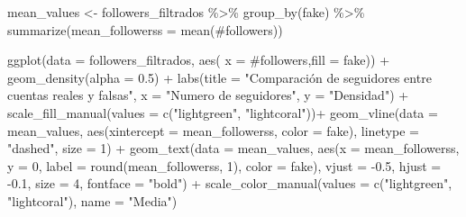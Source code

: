 \documentclass[
  letterpaper,
  DIV=11,
  numbers=noendperiod]{scrreprt}
\newenvironment{Shaded}{\begin{snugshade}}{\end{snugshade}}
\newcommand{\AttributeTok}[1]{\textcolor[rgb]{0.40,0.45,0.13}{#1}}
\newcommand{\DecValTok}[1]{\textcolor[rgb]{0.68,0.00,0.00}{#1}}
\newcommand{\FloatTok}[1]{\textcolor[rgb]{0.68,0.00,0.00}{#1}}
\newcommand{\FunctionTok}[1]{\textcolor[rgb]{0.28,0.35,0.67}{#1}}
\newcommand{\NormalTok}[1]{\textcolor[rgb]{0.00,0.23,0.31}{#1}}
\newcommand{\OtherTok}[1]{\textcolor[rgb]{0.00,0.23,0.31}{#1}}
\newcommand{\SpecialCharTok}[1]{\textcolor[rgb]{0.37,0.37,0.37}{#1}}
\newcommand{\StringTok}[1]{\textcolor[rgb]{0.13,0.47,0.30}{#1}}
\begin{document}
\begin{Shaded}
\begin{Highlighting}[]
\NormalTok{mean\_values }\OtherTok{\textless{}{-}}\NormalTok{ followers\_filtrados }\SpecialCharTok{\%\textgreater{}\%} 
  \FunctionTok{group\_by}\NormalTok{(fake) }\SpecialCharTok{\%\textgreater{}\%} 
  \FunctionTok{summarize}\NormalTok{(}\AttributeTok{mean\_followerss =} \FunctionTok{mean}\NormalTok{(}\StringTok{\textasciigrave{}}\AttributeTok{\#followers}\StringTok{\textasciigrave{}}\NormalTok{))}

\FunctionTok{ggplot}\NormalTok{(}\AttributeTok{data =}\NormalTok{ followers\_filtrados, }\FunctionTok{aes}\NormalTok{( }\AttributeTok{x =} \StringTok{\textasciigrave{}}\AttributeTok{\#followers}\StringTok{\textasciigrave{}}\NormalTok{,}\AttributeTok{fill =} \StringTok{\textasciigrave{}}\AttributeTok{fake}\StringTok{\textasciigrave{}}\NormalTok{)) }\SpecialCharTok{+}   \FunctionTok{geom\_density}\NormalTok{(}\AttributeTok{alpha =} \FloatTok{0.5}\NormalTok{) }\SpecialCharTok{+}   
  \FunctionTok{labs}\NormalTok{(}\AttributeTok{title =} \StringTok{"Comparación de seguidores entre cuentas reales y falsas"}\NormalTok{,        }
       \AttributeTok{x =} \StringTok{"Numero de seguidores"}\NormalTok{,        }
       \AttributeTok{y =} \StringTok{"Densidad"}\NormalTok{) }\SpecialCharTok{+}   
  \FunctionTok{scale\_fill\_manual}\NormalTok{(}\AttributeTok{values =} \FunctionTok{c}\NormalTok{(}\StringTok{"lightgreen"}\NormalTok{, }\StringTok{"lightcoral"}\NormalTok{))}\SpecialCharTok{+}
  \FunctionTok{geom\_vline}\NormalTok{(}\AttributeTok{data =}\NormalTok{ mean\_values, }\FunctionTok{aes}\NormalTok{(}\AttributeTok{xintercept =}\NormalTok{ mean\_followerss, }\AttributeTok{color =}\NormalTok{ fake), }\AttributeTok{linetype =} \StringTok{"dashed"}\NormalTok{, }\AttributeTok{size =} \DecValTok{1}\NormalTok{) }\SpecialCharTok{+}
   \FunctionTok{geom\_text}\NormalTok{(}\AttributeTok{data =}\NormalTok{ mean\_values, }\FunctionTok{aes}\NormalTok{(}\AttributeTok{x =}\NormalTok{ mean\_followerss, }\AttributeTok{y =} \DecValTok{0}\NormalTok{, }\AttributeTok{label =} \FunctionTok{round}\NormalTok{(mean\_followerss, }\DecValTok{1}\NormalTok{), }\AttributeTok{color =}\NormalTok{ fake),}
            \AttributeTok{vjust =} \SpecialCharTok{{-}}\FloatTok{0.5}\NormalTok{, }\AttributeTok{hjust =} \SpecialCharTok{{-}}\FloatTok{0.1}\NormalTok{, }\AttributeTok{size =} \DecValTok{4}\NormalTok{, }\AttributeTok{fontface =} \StringTok{"bold"}\NormalTok{) }\SpecialCharTok{+}
  \FunctionTok{scale\_color\_manual}\NormalTok{(}\AttributeTok{values =} \FunctionTok{c}\NormalTok{(}\StringTok{"lightgreen"}\NormalTok{, }\StringTok{"lightcoral"}\NormalTok{), }\AttributeTok{name =} \StringTok{"Media"}\NormalTok{)}
\end{Highlighting}
\end{Shaded}
\end{document}
